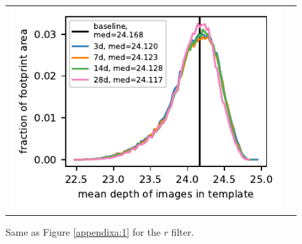\documentclass[preprintm,linenumbers]{aastex631}
\begin{document}
\begin{figure}[h]
\begin{tabular}{@{}c@{}c@{}}
				\includegraphics{results/histograms_templates_tscale/hist_first_year_one_snap_v4_0_10yrs_db_noDD_noTwi_doALLTemplateMetrics_reduceDepthTemplate_r_noDD_noTwi.pdf} \\
				
			\end{tabular}
			
			\caption{
				Same as Figure \ref{appendixa:1} for the $r$ filter.  \label{appendixa:3}
			}
		\end{figure}
\end{document}
